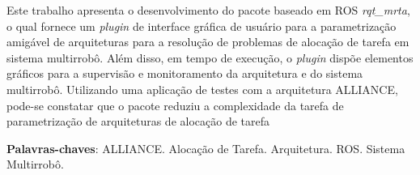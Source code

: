 \newpage
\begin{resumo}
    Este trabalho apresenta o desenvolvimento do pacote baseado em ROS \textit{rqt\_mrta}, o qual fornece um \textit{plugin} de interface gráfica de usuário para a parametrização amigável de arquiteturas para a resolução de problemas de alocação de tarefa em sistema multirrobô. Além disso, em tempo de execução, o \textit{plugin} dispõe elementos gráficos para a supervisão e monitoramento da arquitetura e do sistema multirrobô. Utilizando uma aplicação de testes com a arquitetura ALLIANCE, pode-se constatar que o pacote reduziu a complexidade da tarefa de parametrização de arquiteturas de alocação de tarefa
    \vspace{\onelineskip}
    
    \noindent
    \textbf{Palavras-chaves}: ALLIANCE. Alocação de Tarefa. Arquitetura. ROS. Sistema Multirrobô. 
\end{resumo}
\newpage